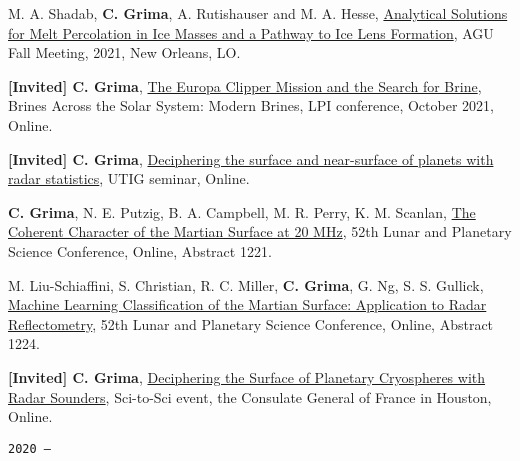 \begin{etaremune}
\item
   M. A. Shadab, \textbf{C. Grima}, A. Rutishauser and M. A. Hesse, \href{https://agu.confex.com/agu/fm21/meetingapp.cgi/Paper/832820}{Analytical Solutions for Melt Percolation in Ice Masses and a Pathway to Ice Lens Formation}, AGU Fall Meeting, 2021, New Orleans, LO.
\item
   \textbf{{[}Invited{]} C. Grima}, \href{https://www.hou.usra.edu/meetings/modernbrines2021/pdf/modernbrines2021_program.htm}{The Europa Clipper Mission and the Search for Brine}, Brines Across the Solar System: Modern Brines, LPI conference, October 2021, Online.
\item
   \textbf{{[}Invited{]} C. Grima}, \href{https://twitter.com/UTGeophysics/status/1377991205414375424}{Deciphering the surface and near-surface of planets with radar statistics}, UTIG seminar, Online.
\item
  \textbf{C. Grima}, N. E. Putzig, B. A. Campbell, M. R. Perry, K. M. Scanlan, \href{https://}{The Coherent Character of the Martian Surface at 20 MHz}, 52th Lunar and Planetary Science Conference, Online, Abstract 1221.
\item
  M. Liu-Schiaffini, S. Christian, R. C. Miller, \textbf{C. Grima}, G. Ng, S. S. Gullick, \href{https://}{Machine Learning Classification of the Martian Surface: Application to Radar Reflectometry}, 52th Lunar and Planetary Science Conference, Online, Abstract 1224.
\item
  \textbf{{[}Invited{]} C. Grima}, \href{https://}{Deciphering the Surface of Planetary Cryospheres with Radar Sounders}, Sci-to-Sci event, the Consulate General of France in Houston, Online.

\hspace{-2em}\texttt{2020 ---}


\end{etaremune}

